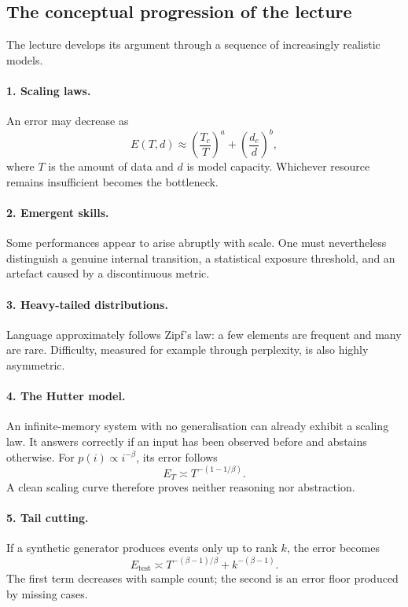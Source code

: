 \subsection{The conceptual progression of the lecture}

The lecture develops its argument through a sequence of increasingly realistic models.

\paragraph{1. Scaling laws.} An error may decrease as
\[
E(T,d) \approx \left(\frac{T_c}{T}\right)^a + \left(\frac{d_c}{d}\right)^b,
\]
where $T$ is the amount of data and $d$ is model capacity. Whichever resource remains insufficient becomes the bottleneck.

\paragraph{2. Emergent skills.} Some performances appear to arise abruptly with scale. One must nevertheless distinguish a genuine internal transition, a statistical exposure threshold, and an artefact caused by a discontinuous metric.

\paragraph{3. Heavy-tailed distributions.} Language approximately follows Zipf's law: a few elements are frequent and many are rare. Difficulty, measured for example through perplexity, is also highly asymmetric.

\paragraph{4. The Hutter model.} An infinite-memory system with no generalisation can already exhibit a scaling law. It answers correctly if an input has been observed before and abstains otherwise. For $p(i)\propto i^{-\beta}$, its error follows
\[
E_T \asymp T^{-(1-1/\beta)}.
\]
A clean scaling curve therefore proves neither reasoning nor abstraction.

\paragraph{5. Tail cutting.} If a synthetic generator produces events only up to rank $k$, the error becomes
\[
E_{\mathrm{test}} \asymp T^{-(\beta-1)/\beta} + k^{-(\beta-1)}.
\]
The first term decreases with sample count; the second is an error floor produced by missing cases.

